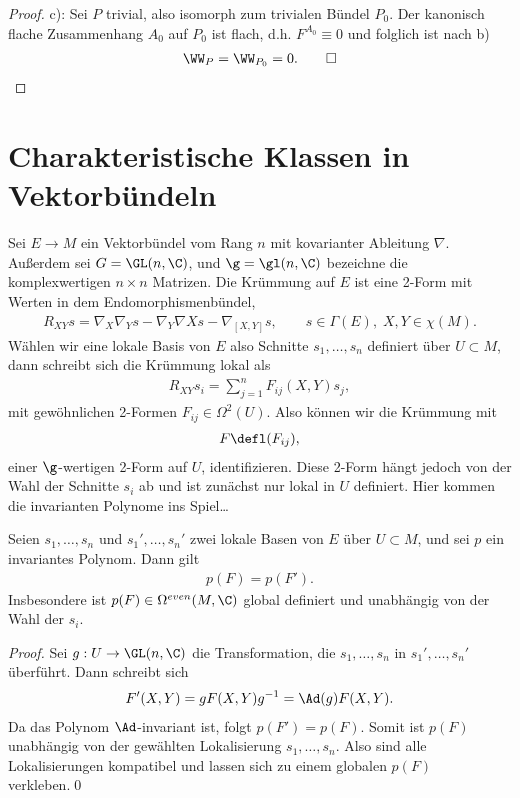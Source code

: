 \documentclass[%
	paper=a5,%
	fleqn,%
	DIV=18,%
	BCOR=0mm,
	fontsize=11pt,
	titlepage=false,%
	bibliography=totoc,
	DIV=18,%
	twoside=true,
	pdftitle=Riemannsche Geometrie,
	pdfauthor=Uwe Semmelmann,
	numbers=noendperiod]%
	{scrbook}
\begin{document}
\begin{proof}
c): Sei $P$ trivial, also isomorph zum trivialen Bündel $P_0$. Der
kanonisch flache Zusammenhang $A_0$ auf $P_0$ ist flach, d.h. $F^{A_0}\equiv 0$
und folglich ist nach b)
\begin{align*}
\WW_P = \WW_{P_0} = 0.\qed
\end{align*}

\end{proof}

\section{Charakteristische Klassen in Vektorbündeln}

Sei $E\to M$ ein Vektorbündel vom Rang $n$ mit kovarianter Ableitung $\nabla$.
Außerdem sei $G = \GL(n,\C)$, und $\g = \gl(n,\C)$ bezeichne die
komplexwertigen $n\times n$ Matrizen. Die Krümmung auf $E$ ist eine 2-Form mit
Werten in dem Endomorphismenbündel,
\begin{align*}
R_{XY}s = \nabla_X\nabla_Y s - \nabla_Y \nabla X s - \nabla_{[X,Y]}s,\qquad
s\in \Gamma(E),\; X,Y\in \chi(M).
\end{align*}
Wählen wir eine lokale Basis von $E$ also Schnitte $s_1,\ldots,s_n$ definiert
über $U\subset M$, dann schreibt sich die Krümmung lokal als
\begin{align*}
R_{XY}s_i = \sum_{j=1}^n F_{ij}(X,Y)s_j,
\end{align*}
mit gewöhnlichen 2-Formen $F_{ij}\in\Omega^2(U)$. Also können wir die Krümmung
mit
\begin{align*}
F \defl (F_{ij}), 
\end{align*}
einer $\g$-wertigen 2-Form auf $U$, identifizieren. Diese 2-Form hängt jedoch von
der Wahl der Schnitte $s_i$ ab und ist zunächst nur lokal in $U$ definiert. Hier
kommen die invarianten Polynome ins Spiel\ldots

\begin{lem}
Seien $s_1,\ldots,s_n$ und $s_1',\ldots,s_n'$ zwei lokale Basen von $E$ über
$U\subset M$, und sei $p$ ein invariantes Polynom. Dann gilt
\begin{align*}
p(F) = p(F').
\end{align*}
Insbesondere ist $p(F)\in\Omega^{even}(M,\C)$ global definiert und unabhängig
von der Wahl der $s_i$.\fish
\end{lem}

\begin{proof}
Sei $g: U\to \GL(n,\C)$ die Transformation, die $s_1,\ldots,s_n$ in
$s_1',\ldots,s_n'$ überführt. Dann schreibt sich
\begin{align*}
F'(X,Y) = gF(X,Y)g^{-1} = \Ad(g)F(X,Y).
\end{align*}
Da das Polynom $\Ad$-invariant ist, folgt $p(F') = p(F)$. Somit ist $p(F)$
unabhängig von der gewählten Lokalisierung $s_1,\ldots,s_n$. Also sind alle
Lokalisierungen kompatibel und lassen sich zu einem globalen $p(F)$
verkleben.\qed
\end{proof}
\end{document}
